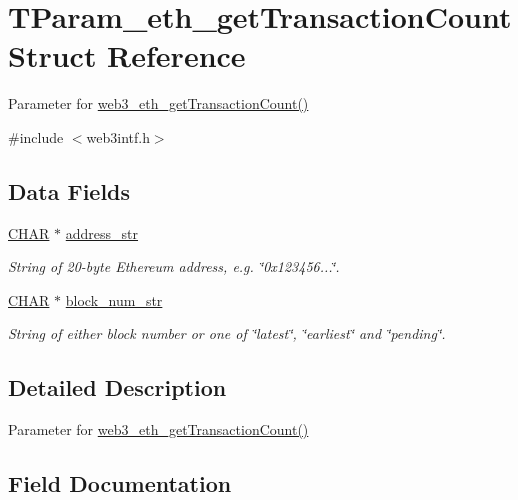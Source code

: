\hypertarget{struct_t_param__eth__get_transaction_count}{}\section{T\+Param\+\_\+eth\+\_\+get\+Transaction\+Count Struct Reference}
\label{struct_t_param__eth__get_transaction_count}


Parameter for \mbox{\hyperlink{web3intf_8c_a6561f38f788b3ebe93c66a1db255377a}{web3\+\_\+eth\+\_\+get\+Transaction\+Count()}}  




{\ttfamily \#include $<$web3intf.\+h$>$}

\subsection*{Data Fields}
\begin{DoxyCompactItemize}
\item 
\mbox{\hyperlink{boattypes_8h_aebb9e13210d88d43e32e735ada43a425}{C\+H\+AR}} $\ast$ \mbox{\hyperlink{struct_t_param__eth__get_transaction_count_ab1b9f5fe62033b1d7fb013b2e8718c03}{address\+\_\+str}}
\begin{DoxyCompactList}\small\item\em String of 20-\/byte Ethereum address, e.\+g. \char`\"{}0x123456...\char`\"{}. \end{DoxyCompactList}\item 
\mbox{\hyperlink{boattypes_8h_aebb9e13210d88d43e32e735ada43a425}{C\+H\+AR}} $\ast$ \mbox{\hyperlink{struct_t_param__eth__get_transaction_count_af78d86478ad38ef1fecad6bfb059bd27}{block\+\_\+num\+\_\+str}}
\begin{DoxyCompactList}\small\item\em String of either block number or one of \char`\"{}latest\char`\"{}, \char`\"{}earliest\char`\"{} and \char`\"{}pending\char`\"{}. \end{DoxyCompactList}\end{DoxyCompactItemize}


\subsection{Detailed Description}
Parameter for \mbox{\hyperlink{web3intf_8c_a6561f38f788b3ebe93c66a1db255377a}{web3\+\_\+eth\+\_\+get\+Transaction\+Count()}} 

\subsection{Field Documentation}
\mbox{\label{struct_t_param__eth__get_transaction_count_ab1b9f5fe62033b1d7fb013b2e8718c03}} 
